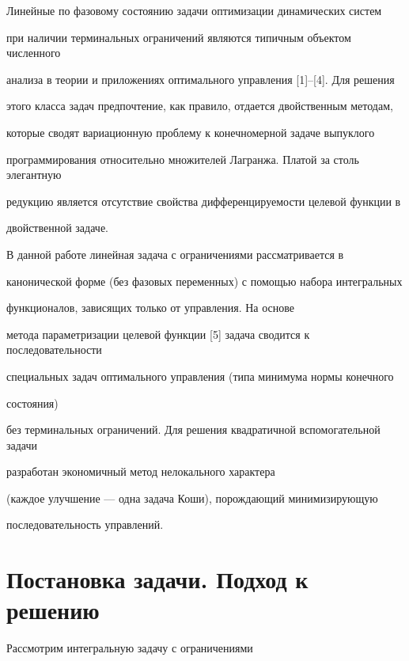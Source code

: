 \label{begin}





Линейные по фазовому состоянию задачи оптимизации динамических систем


при наличии терминальных ограничений являются типичным объектом численного


анализа в теории и приложениях оптимального управления [1]--[4]. Для решения


этого класса задач предпочтение, как правило, отдается двойственным методам,


которые сводят вариационную проблему к конечномерной задаче выпуклого 


программирования относительно множителей Лагранжа. Платой за столь элегантную


редукцию является отсутствие свойства дифференцируемости целевой функции в


двойственной задаче.





В данной работе линейная задача с ограничениями рассматривается в 


канонической форме (без фазовых переменных) с помощью набора интегральных


функционалов, зависящих только от управления. На основе 


метода параметризации целевой функции [5] задача сводится к последовательности


специальных задач оптимального управления (типа минимума нормы конечного 


состояния)


без терминальных ограничений. Для решения квадратичной вспомогательной задачи 


разработан экономичный метод нелокального характера


(каждое улучшение --- одна задача Коши), порождающий минимизирующую


последовательность управлений.





\section{Постановка задачи. Подход к решению}





Рассмотрим интегральную задачу с ограничениями 


